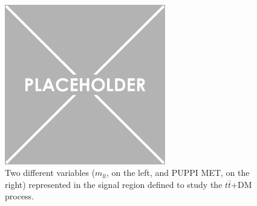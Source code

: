 \documentclass[a4paper, 10pt, openright]{report}
\begin{document}
\begin{figure}[htbp]
{\begin{minipage}[b]{.48\textwidth}
\end{minipage}\hfill
\begin{minipage}[b]{.48\textwidth}
\includegraphics[width=7cm, height=7cm]{figs/placeholder.png}
\end{minipage} \hfill
}
\caption{Two different variables ($m_{ll}$, on the left, and \ac{PUPPI} \ac{MET}, on the right) represented in the signal region defined to study the $t \bar t$+DM process.}
\label{fig:DoubleSR}
\end{figure}
\end{document}
